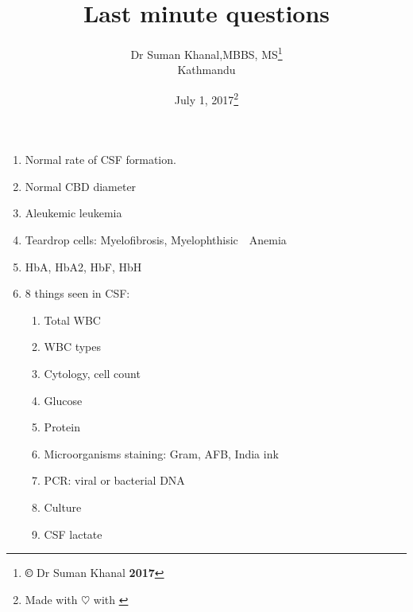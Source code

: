 \documentclass[12pt]{article}
\title{Last minute questions}
\author{Dr Suman Khanal,MBBS, MS\footnote{\textbf{\copyright} Dr Suman Khanal \textbf{2017}}\\ Kathmandu}
\date{July 1, 2017\footnote{Made with $\heartsuit$ with \href{https://www.latex-project.org/}{\LaTeXe}}}
\begin{document}
\maketitle



\begin{enumerate}
	\item Normal rate of CSF formation.
	\item Normal CBD diameter
	\item Aleukemic leukemia
	\item Teardrop cells: Myelofibrosis, Myelophthisic Anemia
	\item HbA, HbA2, HbF, HbH
	\item 8 things seen in CSF:
	\begin{enumerate}
	\item Total WBC
	\item WBC types
	\item Cytology, cell count
	\item Glucose
	\item Protein
	\item Microorganisms staining: Gram, AFB, India ink
	\item PCR: viral or bacterial DNA
	\item Culture
	\item CSF lactate
	\end{enumerate}
	
	
\end{enumerate}
\end{document}

